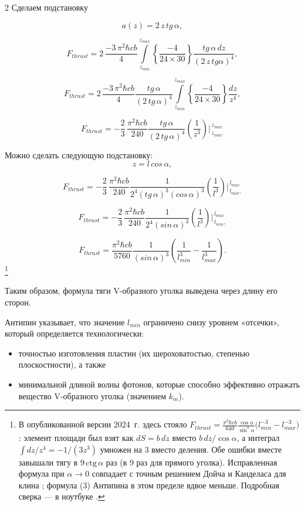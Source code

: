 \documentclass[twoside, 10pt]{article}
\begin{document}
\begin{multicols}{2}
Сделаем подстановку

\[a\left(z\right) = 2\,z\,tg\, \alpha,\]

\[F_{thrust} = 2\, \frac{-3\,\pi^2\hbar c b}{4}\int\limits_{z_{min}}^{z_{max}} \left\{\frac{-4}{24\times30}\right\}\frac{tg\, \alpha\,dz}{\left(2\,z\,tg \alpha\right)^4},\]

\[F_{thrust} = 2\, \frac{-3\,\pi^2\hbar c b}{4} \frac{tg\, \alpha}{\left(2\,tg\, \alpha\right)^4} \int\limits_{z_{min}}^{z_{max}} \left\{\frac{-4}{24\times30}\right\} \frac{dz}{z^4},\]

\[F_{thrust} = -\frac{2}{3}\, \frac{\pi^2\hbar c b}{240} \frac{tg\, \alpha}{\left(2\,tg\, \alpha\right)^4} \left(\frac{1}{z^3}\right)\Bigg\rvert_{\,z_{min}.}^{\,z_{max}} \]

    Можно сделать следующую подстановку: \[z = l\, cos\, \alpha,\]

\[F_{thrust} = -\frac{2}{3}\, \frac{\pi^2\hbar c b}{240} \frac{1}{2^4\left(tg\,\alpha\right)^3\left(cos\, \alpha\right)^3} \left(\frac{1}{l^3}\right)\Bigg\rvert_{\,l_{min},}^{\,l_{max}} \]

\[F_{thrust} = -\frac{2}{3}\, \frac{\pi^2\hbar c b}{240} \frac{1}{2^4\left(sin\, \alpha\right)^3} \left(\frac{1}{l^3}\right)\Bigg\rvert_{\,l_{min},}^{\,l_{max}} \]

\noindent
\begin{equation}F_{thrust} = \frac{\pi^2\hbar c b}{5760} \frac{1}{\left(sin\, \alpha\right)^3} \left(\frac{1}{l_{min}^3} - \frac{1}{l_{max}^3}\right).\end{equation}\footnote{В опубликованной версии 2024~г. здесь стояло \(F_{thrust}=\frac{\pi^2\hbar c b}{640}\frac{\cos\alpha}{\sin^4\alpha}\big(l_{min}^{-3}-l_{max}^{-3}\big)\): элемент площади был взят как \(dS=b\,dz\) вместо \(b\,dz/\cos\alpha\), а интеграл \(\int dz/z^4=-1/(3z^3)\) умножен на 3 вместо деления. Обе ошибки вместе завышали тягу в \(9\,\mathrm{ctg}\,\alpha\) раз (в 9 раз для прямого уголка). Исправленная формула при \(\alpha\to0\) совпадает с точным решением Дойча и Канделаса для клина \cite{Deutsch1979}; формула (3) Антипина \cite{Antipin2017} в этом пределе вдвое меньше. Подробная сверка — в ноутбуке \cite{AngleNotebook}.}

Таким образом, формула тяги \mbox{V-образного} уголка выведена через длину его сторон.

Антипин указывает, что значение \(l_{min}\) ограничено снизу уровнем «отсечки», который определяется технологически:

\begin{itemize}
\item
  точностью изготовления пластин (их шероховатостью, степенью плоскостности), а также
\item
  минимальной длиной волны фотонов, которые способно эффективно отражать вещество \mbox{V-образного} уголка (значением \(k_m\)).
\end{itemize}


\end{multicols}
\end{document}
